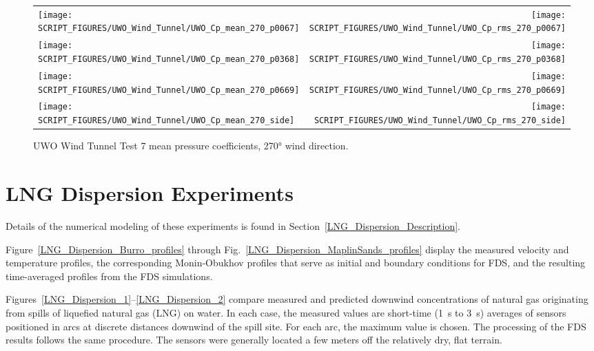 \begin{figure}[p]
\begin{tabular*}{\textwidth}{l@{\extracolsep{\fill}}r}
\texttt{[image: SCRIPT\_FIGURES/UWO\_Wind\_Tunnel/UWO\_Cp\_mean\_270\_p0067]} &
\texttt{[image: SCRIPT\_FIGURES/UWO\_Wind\_Tunnel/UWO\_Cp\_rms\_270\_p0067]} \\
\texttt{[image: SCRIPT\_FIGURES/UWO\_Wind\_Tunnel/UWO\_Cp\_mean\_270\_p0368]} &
\texttt{[image: SCRIPT\_FIGURES/UWO\_Wind\_Tunnel/UWO\_Cp\_rms\_270\_p0368]} \\
\texttt{[image: SCRIPT\_FIGURES/UWO\_Wind\_Tunnel/UWO\_Cp\_mean\_270\_p0669]} &
\texttt{[image: SCRIPT\_FIGURES/UWO\_Wind\_Tunnel/UWO\_Cp\_rms\_270\_p0669]} \\
\texttt{[image: SCRIPT\_FIGURES/UWO\_Wind\_Tunnel/UWO\_Cp\_mean\_270\_side]} &
\texttt{[image: SCRIPT\_FIGURES/UWO\_Wind\_Tunnel/UWO\_Cp\_rms\_270\_side]}
\end{tabular*}
\caption[UWO Wind Tunnel Test 7 Pressure Coefficients, 270\si{\degree}]{UWO Wind Tunnel Test 7 mean pressure coefficients, 270\si{\degree} wind direction.}
\label{UWO_Test_7_pressure_coefficients_270}
\end{figure}



\section{LNG Dispersion Experiments}
\label{Atmospheric Dispersion}

Details of the numerical modeling of these experiments is found in Section~\ref{LNG_Dispersion_Description}.

Figure~\ref{LNG_Dispersion_Burro_profiles} through Fig.~\ref{LNG_Dispersion_MaplinSands_profiles} display the measured velocity and temperature profiles, the corresponding Monin-Obukhov profiles that serve as initial and boundary conditions for FDS, and the resulting time-averaged profiles from the FDS simulations.

Figures~\ref{LNG_Dispersion_1}--\ref{LNG_Dispersion_2} compare measured and predicted downwind concentrations of natural gas originating from spills of liquefied natural gas (LNG) on water. In each case, the measured values are short-time (1~s to 3~s) averages of sensors positioned in arcs at discrete distances downwind of the spill site. For each arc, the maximum value is chosen. The processing of the FDS results follows the same procedure. The sensors were generally located a few meters off the relatively dry, flat terrain.

